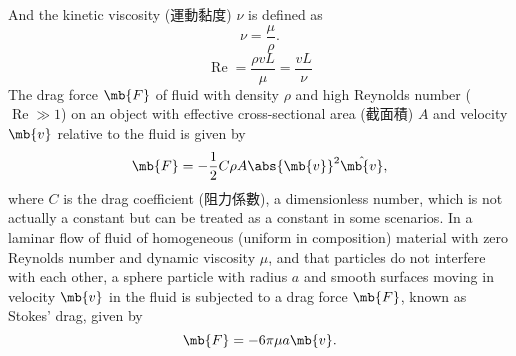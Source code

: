 \documentclass[a4paper,12pt]{article}
\begin{document}
And the kinetic viscosity (運動黏度) $\nu$ is defined as
\[\nu=\frac{\mu}{\rho}.\]
\[\operatorname{Re}=\frac{\rho v L}{\mu}=\frac{v L}{\nu}\]
The drag force $\mb{F}$ of fluid with density $\rho$ and high Reynolds number ($\operatorname{Re}\gg 1$) on an object with effective cross-sectional area (截面積) $A$ and velocity $\mb{v}$ relative to the fluid is given by
\[\mb{F}=-\frac{1}{2}C\rho A\abs{\mb{v}}^2\hat{\mb{v}},\]
where $C$ is the drag coefficient (阻力係數), a dimensionless number, which is not actually a constant but can be treated as a constant in some scenarios.
In a laminar flow of fluid of homogeneous (uniform in composition) material with zero Reynolds number and dynamic viscosity $\mu$, and that particles do not interfere with each other, a sphere particle with radius $a$ and smooth surfaces moving in velocity $\mb{v}$ in the fluid is subjected to a drag force $\mb{F}$, known as Stokes' drag, given by
\[\mb{F}=-6\pi\mu a\mb{v}.\]
\end{document}
